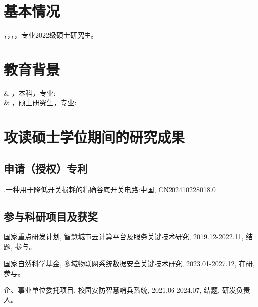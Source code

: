 \section{基本情况} ，，，，专业2022级硕士研究生。 
\section{教育背景}
\begin{edubg}
 & ，本科，专业:\\
& ，硕士研究生，专业:\\
\end{edubg}
\section{攻读硕士学位期间的研究成果}
\subsection{申请（授权）专利}
\begin{resresult}
	\item {}.一种用于降低开关损耗的精确谷底开关电路:中国, CN202410228018.0
\end{resresult}

\subsection{参与科研项目及获奖}
\begin{resresult}
	\item 国家重点研发计划, 智慧城市云计算平台及服务关键技术研究, 2019.12-2022.11, 结题, 参与。
	\item 国家自然科学基金, 多域物联网系统数据安全关键技术研究, 2023.01-2027.12, 在研, 参与。
	\item 企、事业单位委托项目, 校园安防智慧哨兵系统, 2021.06-2024.07, 结题, 研发负责人。

\end{resresult}

